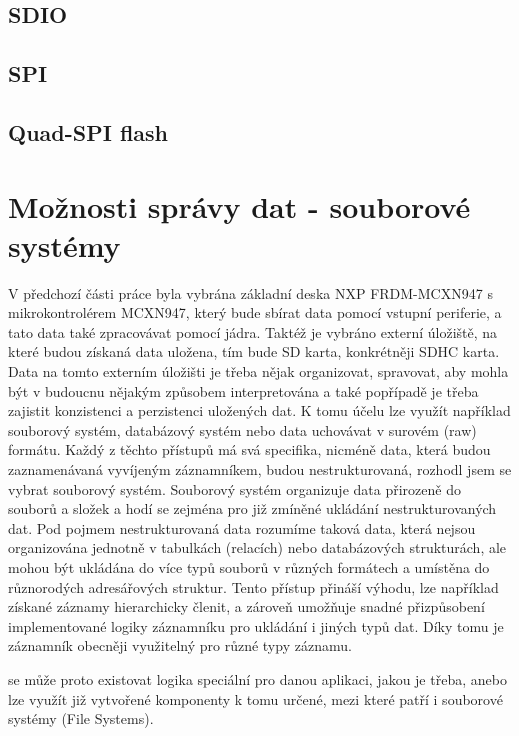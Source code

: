 \subsection{SDIO}

\subsection{SPI}

\subsection{Quad-SPI flash}


\section{Možnosti správy dat - souborové systémy}
V předchozí části práce byla vybrána základní deska NXP FRDM-MCXN947 s mikrokontrolérem MCXN947, který bude sbírat data pomocí vstupní periferie, a tato data také zpracovávat pomocí jádra. Taktéž je vybráno externí úložiště, na které budou získaná data uložena, tím bude SD karta, konkrétněji SDHC karta. Data na tomto externím úložišti je třeba nějak organizovat, spravovat, aby mohla být v budoucnu nějakým způsobem interpretována a také popřípadě je třeba zajistit konzistenci a perzistenci uložených dat. K tomu účelu lze využít například souborový systém, databázový systém nebo data uchovávat v surovém (raw) formátu. Každý z těchto přístupů má svá specifika, nicméně data, která budou zaznamenávaná vyvíjeným záznamníkem, budou nestrukturovaná, rozhodl jsem se vybrat souborový systém. Souborový systém organizuje data přirozeně do souborů a složek a hodí se zejména pro již zmíněné ukládání nestrukturovaných dat. Pod pojmem nestrukturovaná data rozumíme taková data, která nejsou organizována jednotně v tabulkách (relacích) nebo databázových strukturách, ale mohou být ukládána do více typů souborů v různých formátech a umístěna do různorodých adresářových struktur. Tento přístup přináší výhodu, lze například získané záznamy hierarchicky členit, a zároveň umožňuje snadné přizpůsobení implementované logiky záznamníku pro ukládání i jiných typů dat. Díky tomu je záznamník obecněji využitelný pro různé typy záznamu. \cite{weka_structured_unstructured_data, virginia_tech_file_database_systems}

se  může proto existovat logika speciální pro danou aplikaci, jakou je třeba, anebo lze využít již vytvořené komponenty k tomu určené, mezi které patří i souborové systémy (File Systems).


